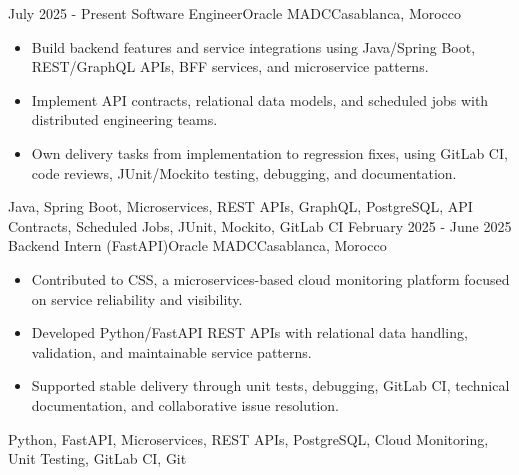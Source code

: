 
\begin{experiences}
  \experience
    {July 2025 - Present}
    {Software Engineer}{Oracle MADC}{Casablanca, Morocco}
    {} {
      \begin{itemize}
        \item Build backend features and service integrations using Java/Spring Boot, REST/GraphQL APIs, BFF services, and microservice patterns.
        \item Implement API contracts, relational data models, and scheduled jobs with distributed engineering teams.
        \item Own delivery tasks from implementation to regression fixes, using GitLab CI, code reviews, JUnit/Mockito testing, debugging, and documentation.
      \end{itemize}
    }
    {Java, Spring Boot, Microservices, REST APIs, GraphQL, PostgreSQL, API Contracts, Scheduled Jobs, JUnit, Mockito, GitLab CI}
  \experience
    {February 2025 - June 2025}
    {Backend Intern (FastAPI)}{Oracle MADC}{Casablanca, Morocco}
    {} {
      \begin{itemize}
        \item Contributed to CSS, a microservices-based cloud monitoring platform focused on service reliability and visibility.
        \item Developed Python/FastAPI REST APIs with relational data handling, validation, and maintainable service patterns.
        \item Supported stable delivery through unit tests, debugging, GitLab CI, technical documentation, and collaborative issue resolution.
      \end{itemize}
    }
    {Python, FastAPI, Microservices, REST APIs, PostgreSQL, Cloud Monitoring, Unit Testing, GitLab CI, Git}
  \emptySeparator
\end{experiences}
